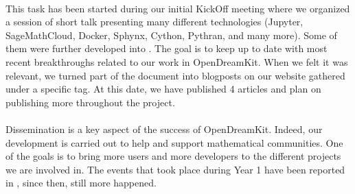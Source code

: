 \documentclass{deliverablereport}
\begin{document}
\paragraph{}

This task has been started during our initial KickOff meeting where we organized a session of short
talk presenting many different technologies (Jupyter, SageMathCloud, Docker, Sphynx, Cython, Pythran, and
many more). Some of them were further developed into . The goal is to
keep up to date with most recent breakthroughs related to our work in OpenDreamKit. When we felt
it was relevant, we turned part of the document into blogposts on our website gathered under a 
specific tag. At this date, we have published 4 articles and plan on publishing more throughout the
project.

\paragraph{}

Dissemination is a key aspect of the success of OpenDreamKit. Indeed, our development is carried
out to help and support mathematical communities. One of the goals is to bring
more users and more developers to the different projects we are involved in. The events
that took place during Year 1 have been reported in , since then, still
more happened.
\end{document}
